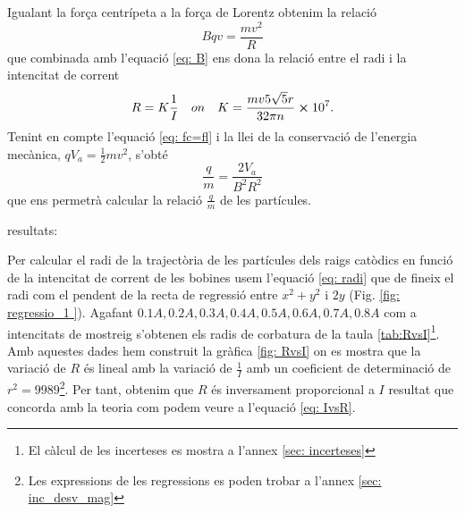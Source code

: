 \documentclass[11pt]{article}
\begin{document}
Igualant la força centrípeta a la força de Lorentz obtenim la relació 
\begin{equation}
    Bqv=\frac{mv^2}{R}
    \label{eq: fc=fl}
\end{equation}
que combinada amb l'equació \ref{eq: B} ens dona la relació entre el radi i la intencitat de corrent
\begin{equation}
    R=K\frac{1}{I} \quad on \quad K=\frac{mv5\sqrt{5}r}{32\pi n}\cross 10^7.
    \label{eq: IvsR}
\end{equation}
Tenint en compte l'equació \ref{eq: fc=fl} i la llei de la conservació de l'energia mecànica, $qV_a = \frac{1}{2}mv^2$, s'obté 
\begin{equation}
    \frac{q}{m}=\frac{2V_a }{B^2R^2}
    \label{eq: q/m}
\end{equation}
que ens permetrà calcular la relació $\frac{q}{m}$ de les partícules.

resultats:

Per calcular el radi de la trajectòria de les partícules dels raigs catòdics en funció de la intencitat de corrent de les bobines usem l'equació \ref{eq: radi} que de fineix el radi com el pendent de la recta de regressió entre $x^2+y^2$ i $2y$ (Fig. \ref{fig: regressio_1 }). Agafant $0.1A, 0.2A, 0.3A, 0.4A, 0.5A, 0.6A, 0.7A, 0.8A$ com a intencitats de mostreig s'obtenen els radis de corbatura de la taula \ref{tab:RvsI}\footnote{El càlcul de les incerteses es mostra a l'annex \ref{sec: incerteses}}. Amb aquestes dades hem construit la gràfica \ref{fig: RvsI} on es mostra que la variació de $R$ és lineal amb la variació de $\frac{1}{I}$ amb un coeficient de determinació de $r^2=9989$\footnote{Les expressions de les regressions es poden trobar a l'annex \ref{sec: inc_desv_mag}}. Per tant, obtenim que $R$ és inversament proporcional a $I$ resultat que concorda amb la teoria com podem veure a l'equació \ref{eq: IvsR}.

 
\end{document}
